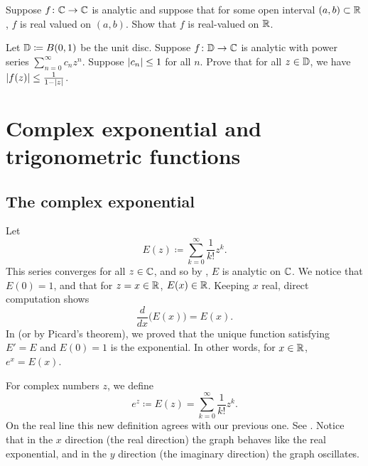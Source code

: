 \begin{exercise}
Suppose $f \colon {\mathbb{C}} \to {\mathbb{C}}$ is analytic and suppose that for some
open interval $(a,b) \subset {\mathbb{R}}$, $f$ is real valued on $(a,b)$.  Show
that $f$ is real-valued on ${\mathbb{R}}$.
\end{exercise}

\begin{exercise}
Let ${\mathbb{D}} \coloneqq B(0,1)$ be the unit disc.  Suppose
$f \colon {\mathbb{D}} \to {\mathbb{C}}$ is analytic with power series
$\sum_{n=0}^\infty c_n z^n$.  Suppose $\lvert {c_n} \rvert \leq 1$ for all $n$.  Prove that for
all $z \in {\mathbb{D}}$, we have
$\lvert {f(z)} \rvert \leq \frac{1}{1-\lvert {z} \rvert}$.
\end{exercise}


\sectionnewpage
\section{Complex exponential and trigonometric functions}
\label{sec:complexexp}



\subsection{The complex exponential}

Let
\begin{equation*}
E(z) \coloneqq \sum_{k=0}^\infty \frac{1}{k!} z^k .
\end{equation*}
This series converges for all $z \in {\mathbb{C}}$, and so by
, $E$ is analytic on ${\mathbb{C}}$.   We notice that $E(0) = 1$,
and that for $z=x \in {\mathbb{R}}$, $E(x) \in {\mathbb{R}}$.  Keeping $x$ real, direct
computation shows
\begin{equation*}
\frac{d}{dx} \bigl( E(x) \bigr) = E(x) .
\end{equation*}
In  (or by Picard's theorem), we proved that
the unique function satisfying $E' = E$ and
$E(0) = 1$ is the exponential.  In other words, for $x \in {\mathbb{R}}$, $e^x = E(x)$.

For complex numbers $z$, we define
\begin{equation*}
e^z \coloneqq E(z) = 
\sum_{k=0}^\infty \frac{1}{k!} z^k .
\end{equation*}
On the real line this new definition agrees with our previous one.
See .  Notice that in the $x$ direction
(the real direction)
the graph behaves like the real exponential, and in the $y$ direction
(the imaginary direction) the graph oscillates.

